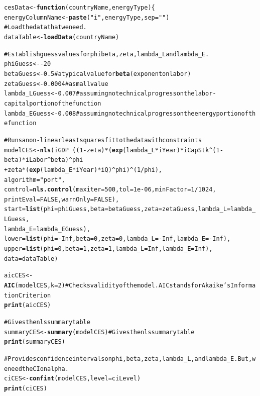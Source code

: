 \documentclass[preprint,authoryear,12pt]{elsarticle}\usepackage{graphicx, color}
\makeatletter
\newcommand{\hlfunctioncall}[1]{\textcolor[rgb]{0.501960784313725,0,0.329411764705882}{\textbf{#1}}}%
\newcommand{\hlstring}[1]{\textcolor[rgb]{0.6,0.6,1}{#1}}%
\newcommand{\hlcomment}[1]{\textcolor[rgb]{0.180392156862745,0.6,0.341176470588235}{#1}}%
\newenvironment{kframe}{%
 \def\at@end@of@kframe{}%
 \ifinner\ifhmode%
  \def\at@end@of@kframe{\end{minipage}}%
  \begin{minipage}{\columnwidth}%
 \fi\fi%
 \def\FrameCommand##1{\hskip\@totalleftmargin \hskip-\fboxsep
 \colorbox{shadecolor}{##1}\hskip-\fboxsep
     \hskip-\linewidth \hskip-\@totalleftmargin \hskip\columnwidth}%
 \MakeFramed {\advance\hsize-\width
   \@totalleftmargin\z@ \linewidth\hsize
   \@setminipage}}%
 {\par\unskip\endMakeFramed%
 \at@end@of@kframe}
\newenvironment{knitrout}{}{} %
\makeatother
\begin{document}
\begin{knitrout}
\color{fgcolor}\begin{kframe}
\begin{alltt}
cesData <- \hlfunctioncall{function}(countryName, energyType)\{
  energyColumnName <- \hlfunctioncall{paste}(\hlstring{"i"}, energyType, sep=\hlstring{""})
\hlcomment{  # Load the data that we need.}
  dataTable <- \hlfunctioncall{loadData}(countryName)
    
\hlcomment{  # Establish guess values for phi beta, zeta, lambda_L and lambda_E.}
  phiGuess <- -20
  betaGuess <- 0.5 \hlcomment{# a typical value for \hlfunctioncall{beta} (exponent on labor)}
  zetaGuess <- 0.0004 \hlcomment{# a small value}
  lambda_LGuess <- 0.007 \hlcomment{#assuming no technical progress on the labor-capital portion of the function}
  lambda_EGuess <- 0.008 \hlcomment{#assuming no technical progress on the energy portion of the function}
  
\hlcomment{  # Runs a non-linear least squares fit to the data with constraints}
  modelCES <- \hlfunctioncall{nls}(iGDP ~ ((1-zeta) * (\hlfunctioncall{exp}(lambda_L*iYear) * iCapStk^(1-beta) * iLabor^beta)^phi 
                           + zeta*(\hlfunctioncall{exp}(lambda_E*iYear) * iQ)^phi)^(1/phi), 
                   algorithm = \hlstring{"port"},
                   control = \hlfunctioncall{nls.control}(maxiter = 500, tol = 1e-06, minFactor = 1/1024, 
                                         printEval = FALSE, warnOnly = FALSE),
                   start = \hlfunctioncall{list}(phi=phiGuess, beta=betaGuess, zeta=zetaGuess, lambda_L=lambda_LGuess, 
                                lambda_E=lambda_EGuess),
                   lower = \hlfunctioncall{list}(phi=-Inf, beta=0, zeta=0, lambda_L=-Inf, lambda_E=-Inf),
                   upper = \hlfunctioncall{list}(phi=0, beta=1, zeta=1, lambda_L=Inf, lambda_E=Inf),
                   data=dataTable)

  aicCES <- \hlfunctioncall{AIC}(modelCES, k=2) \hlcomment{# Checks validity of the model. AIC stands for Akaike's Information Criterion}
  \hlfunctioncall{print}(aicCES)

\hlcomment{  # Gives the nls summary table}
  summaryCES <- \hlfunctioncall{summary}(modelCES) \hlcomment{# Gives the nls summary table}
  \hlfunctioncall{print}(summaryCES)
  
\hlcomment{  # Provides confidence intervals on phi, beta, zeta, lambda_L, and lambda_E. But, we need the CI on alpha.}
  ciCES <- \hlfunctioncall{confint}(modelCES, level = ciLevel)
  \hlfunctioncall{print}(ciCES)
  

\end{alltt}
\end{kframe}
\end{knitrout}
\end{document}
